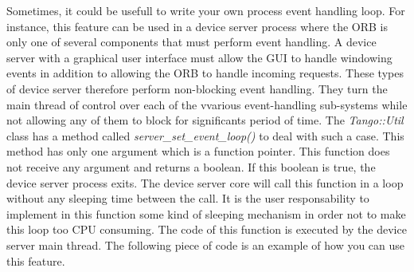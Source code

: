 Sometimes, it could be usefull to write your own process event handling
loop. For instance, this feature can be used in
a device server process where the ORB is only one of several components
that must perform event handling. A device server with a graphical
user interface must allow the GUI to handle windowing events in addition
to allowing the ORB to handle incoming requests. These types of device
server therefore perform non-blocking event handling. They turn the
main thread of control over each of the vvarious event-handling sub-systems
while not allowing any of them to block for significants period of
time. The \emph{Tango::Util} class has a method called \emph{server\_set\_event\_loop()}
to deal with such a case. This method has only one argument which
is a function pointer. This function does not receive any argument
and returns a boolean. If this boolean is true, the device server
process exits. The device server core will call this function in a
loop without any sleeping time between the call. It is the user responsability
to implement in this function some kind of sleeping mechanism in order
not to make this loop too CPU consuming. The code of this function
is executed by the device server main thread. The following
piece of code is an example of how you can use this feature.

